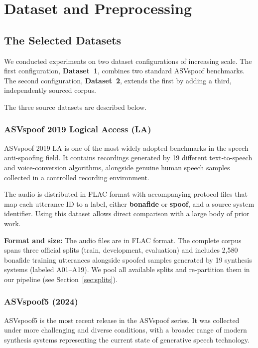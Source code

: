 \documentclass[11pt,a4paper]{article}
\begin{document}
\section{Dataset and Preprocessing}

\subsection{The Selected Datasets}

We conducted experiments on two dataset configurations of increasing scale. The
first configuration, \textbf{Dataset~1}, combines two standard ASVspoof
benchmarks. The second configuration, \textbf{Dataset~2}, extends the first by
adding a third, independently sourced corpus.

The three source datasets are described below.

\subsubsection{ASVspoof 2019 Logical Access (LA)}

ASVspoof 2019 LA \cite{kinnunen2019asvspoof} is one of the most widely adopted
benchmarks in the speech anti-spoofing field. It contains recordings generated by
19 different text-to-speech and voice-conversion algorithms, alongside genuine
human speech samples collected in a controlled recording environment.

The audio is distributed in FLAC format with accompanying protocol files that map
each utterance ID to a label, either \textbf{bonafide} or \textbf{spoof}, and a
source system identifier. Using this dataset allows direct comparison with a large
body of prior work.

\textbf{Format and size:} The audio files are in FLAC format. The complete corpus
spans three official splits (train, development, evaluation) and includes 2,580
bonafide training utterances alongside spoofed samples generated by 19 synthesis
systems (labeled A01--A19). We pool all available splits and re-partition them in
our pipeline (see Section~\ref{sec:splits}).

\subsubsection{ASVspoof5 (2024)}

ASVspoof5 \cite{wang2024asvspoof5} is the most recent release in the ASVspoof
series. It was collected under more challenging and diverse conditions, with a
broader range of modern synthesis systems representing the current state of
generative speech technology.
\end{document}

